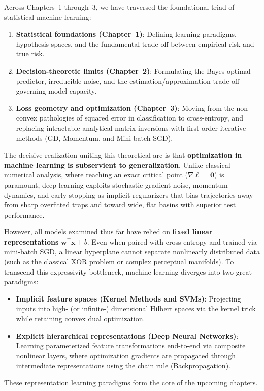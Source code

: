 Across Chapters~1 through~3, we have traversed the foundational triad of statistical machine learning:
\begin{enumerate}[noitemsep,topsep=2pt,parsep=0pt,partopsep=0pt]
  \item \textbf{Statistical foundations (Chapter~1)}: Defining learning paradigms, hypothesis spaces, and the fundamental trade-off between empirical risk and true risk.
  \item \textbf{Decision-theoretic limits (Chapter~2)}: Formulating the Bayes optimal predictor, irreducible noise, and the estimation/approximation trade-off governing model capacity.
  \item \textbf{Loss geometry and optimization (Chapter~3)}: Moving from the non-convex pathologies of squared error in classification to cross-entropy, and replacing intractable analytical matrix inversions with first-order iterative methods (GD, Momentum, and Mini-batch SGD).
\end{enumerate}

The decisive realization uniting this theoretical arc is that \textbf{optimization in machine learning is subservient to generalization}. Unlike classical numerical analysis, where reaching an exact critical point ($\nabla \ell = \mathbf{0}$) is paramount, deep learning exploits stochastic gradient noise, momentum dynamics, and early stopping as implicit regularizers that bias trajectories away from sharp overfitted traps and toward wide, flat basins with superior test performance.

However, all models examined thus far have relied on \textbf{fixed linear representations} $\mathbf{w}^\top \mathbf{x} + b$. Even when paired with cross-entropy and trained via mini-batch SGD, a linear hyperplane cannot separate nonlinearly distributed data (such as the classical XOR problem or complex perceptual manifolds). To transcend this expressivity bottleneck, machine learning diverges into two great paradigms:
\begin{itemize}[noitemsep,topsep=2pt,parsep=0pt,partopsep=0pt]
  \item \textbf{Implicit feature spaces (Kernel Methods and SVMs)}: Projecting inputs into high- (or infinite-) dimensional Hilbert spaces via the kernel trick while retaining convex dual optimization.
  \item \textbf{Explicit hierarchical representations (Deep Neural Networks)}: Learning parameterized feature transformations end-to-end via composite nonlinear layers, where optimization gradients are propagated through intermediate representations using the chain rule (Backpropagation).
\end{itemize}
These representation learning paradigms form the core of the upcoming chapters.


